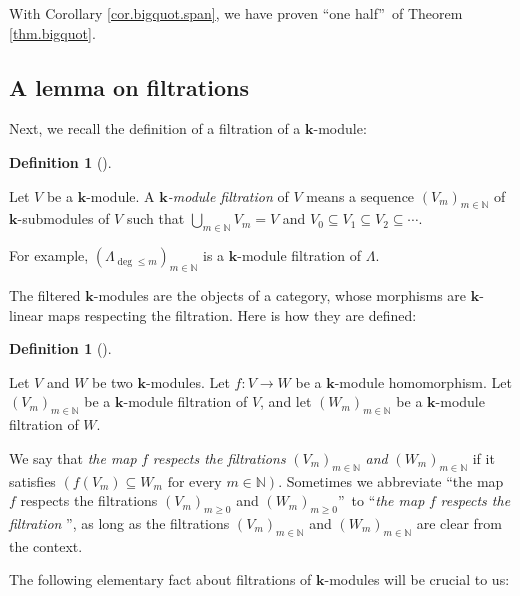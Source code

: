 \documentclass[numbers=enddot,12pt,final,onecolumn,notitlepage]{scrartcl}%
\theoremstyle{definition}
\newtheorem{defi}[theo]{Definition}
\newenvironment{definition}[1][]
{\begin{defi}[#1]\begin{leftbar}}
{\end{leftbar}\end{defi}}
\begin{document}
With Corollary \ref{cor.bigquot.span}, we have proven \textquotedblleft one
half\textquotedblright\ of Theorem \ref{thm.bigquot}.

\subsection{A lemma on filtrations}

Next, we recall the definition of a filtration of a $\mathbf{k}$-module:

\begin{definition}
\label{def.filtr.modfiltr}Let $V$ be a $\mathbf{k}$-module. A $\mathbf{k}%
$\textit{-module filtration} of $V$ means a sequence $\left(  V_{m}\right)
_{m\in\mathbb{N}}$ of $\mathbf{k}$-submodules of $V$ such that $\bigcup
\limits_{m\in\mathbb{N}}V_{m}=V$ and $V_{0}\subseteq V_{1}\subseteq
V_{2}\subseteq\cdots$.
\end{definition}

For example, $\left(  \Lambda_{\deg\leq m}\right)  _{m\in\mathbb{N}}$ is a
$\mathbf{k}$-module filtration of $\Lambda$.

The filtered $\mathbf{k}$-modules are the objects of a category, whose
morphisms are $\mathbf{k}$-linear maps respecting the filtration. Here is how
they are defined:

\begin{definition}
\label{def.filtr.respect}Let $V$ and $W$ be two $\mathbf{k}$-modules. Let
$f:V\rightarrow W$ be a $\mathbf{k}$-module homomorphism. Let $\left(
V_{m}\right)  _{m\in\mathbb{N}}$ be a $\mathbf{k}$-module filtration of $V$,
and let $\left(  W_{m}\right)  _{m\in\mathbb{N}}$ be a $\mathbf{k}$-module
filtration of $W$.

We say that \textit{the map }$f$ \textit{respects the filtrations }$\left(
V_{m}\right)  _{m\in\mathbb{N}}$ \textit{and }$\left(  W_{m}\right)
_{m\in\mathbb{N}}$ if it satisfies $\left(  f\left(  V_{m}\right)  \subseteq
W_{m}\text{ for every }m\in\mathbb{N}\right)  $. Sometimes we abbreviate
\textquotedblleft the map $f$ respects the filtrations $\left(  V_{m}\right)
_{m\geq0}$ and $\left(  W_{m}\right)  _{m\geq0}$\textquotedblright\ to
\textquotedblleft\textit{the map }$f$\textit{ respects the filtration}%
\textquotedblright, as long as the filtrations $\left(  V_{m}\right)
_{m\in\mathbb{N}}$ and $\left(  W_{m}\right)  _{m\in\mathbb{N}}$ are clear
from the context.
\end{definition}

The following elementary fact about filtrations of $\mathbf{k}$-modules will
be crucial to us:
\end{document}
